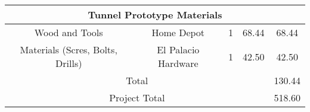 \begin{tabular}{|c|c|c|c|c|}
		\hline
			\multicolumn{5}{|c|}{Tunnel Prototype Materials} \\
		\hline
			Wood and Tools						& Home Depot			& 1 & 68.44 & 68.44 \\
			Materials (Scres, Bolts, Drills)	& El Palacio Hardware	& 1 & 42.50 & 42.50 \\
		\hline
			\multicolumn{4}{|c|}{Total}		& 130.44 \\
		\hline
			\multicolumn{4}{|c|}{Project Total}		& 518.60 \\
		\hline
	\end{tabular} \\


\newpage
